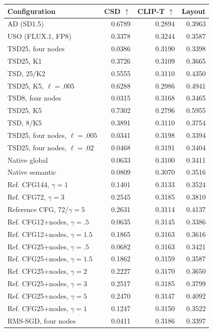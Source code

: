 \begin{tabular}{lrrr}
\toprule
Configuration & CSD $\uparrow$ & CLIP-T $\uparrow$ & Layout \\
\midrule
AD (SD1.5) & 0.6789 & 0.2894 & 0.3963 \\
USO (FLUX.1, FP8) & 0.3378 & 0.3244 & 0.3587 \\
TSD25, four nodes & 0.0386 & 0.3190 & 0.3398 \\
TSD25, K1 & 0.3726 & 0.3109 & 0.3665 \\
TSD, 25/K2 & 0.5555 & 0.3110 & 0.4350 \\
TSD25, K5, $\ell=.005$ & 0.6288 & 0.2986 & 0.4941 \\
TSD8, four nodes & 0.0315 & 0.3168 & 0.3465 \\
TSD25, K5 & 0.7302 & 0.2796 & 0.5955 \\
TSD, 8/K5 & 0.3891 & 0.3110 & 0.3754 \\
TSD25, four nodes, $\ell=.005$ & 0.0341 & 0.3198 & 0.3394 \\
TSD25, four nodes, $\ell=.02$ & 0.0468 & 0.3191 & 0.3404 \\
Native global & 0.0633 & 0.3100 & 0.3411 \\
Native semantic & 0.0809 & 0.3070 & 0.3516 \\
Ref. CFG144, $\gamma=1$ & 0.1401 & 0.3133 & 0.3524 \\
Ref. CFG72, $\gamma=3$ & 0.2545 & 0.3185 & 0.3810 \\
Reference CFG, 72/$\gamma=5$ & 0.2631 & 0.3114 & 0.4137 \\
Ref. CFG12+nodes, $\gamma=.5$ & 0.0635 & 0.3145 & 0.3386 \\
Ref. CFG12+nodes, $\gamma=1.5$ & 0.1865 & 0.3163 & 0.3616 \\
Ref. CFG25+nodes, $\gamma=.5$ & 0.0682 & 0.3163 & 0.3421 \\
Ref. CFG25+nodes, $\gamma=1.5$ & 0.1862 & 0.3159 & 0.3587 \\
Ref. CFG25+nodes, $\gamma=2$ & 0.2227 & 0.3170 & 0.3650 \\
Ref. CFG25+nodes, $\gamma=3$ & 0.2517 & 0.3185 & 0.3799 \\
Ref. CFG25+nodes, $\gamma=5$ & 0.2470 & 0.3147 & 0.4092 \\
Ref. CFG25+nodes, $\gamma=1$ & 0.1247 & 0.3150 & 0.3522 \\
RMS-SGD, four nodes & 0.0411 & 0.3186 & 0.3397 \\
\bottomrule
\end{tabular}
